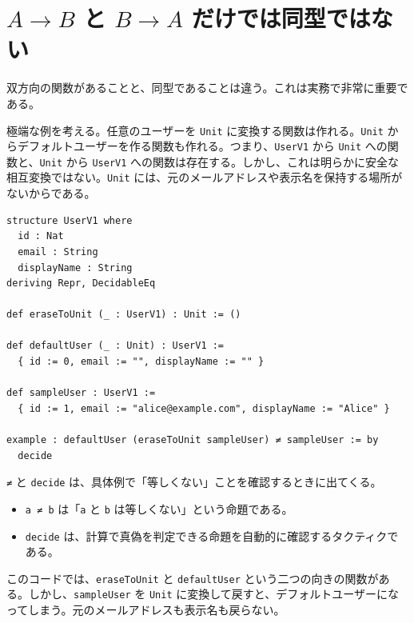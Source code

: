 \section{\texorpdfstring{$A \to B$ と $B \to A$}{A to B と B to A} だけでは同型ではない}
\label{sec:ch06-bidirectional-is-not-enough}

双方向の関数があることと、同型であることは違う。これは実務で非常に重要である。

極端な例を考える。任意のユーザーを \texttt{Unit} に変換する関数は作れる。\texttt{Unit} からデフォルトユーザーを作る関数も作れる。つまり、\texttt{UserV1} から \texttt{Unit} への関数と、\texttt{Unit} から \texttt{UserV1} への関数は存在する。しかし、これは明らかに安全な相互変換ではない。\texttt{Unit} には、元のメールアドレスや表示名を保持する場所がないからである。

\begin{listing}[htbp]
\begin{verbatim}
structure UserV1 where
  id : Nat
  email : String
  displayName : String
deriving Repr, DecidableEq

def eraseToUnit (_ : UserV1) : Unit := ()

def defaultUser (_ : Unit) : UserV1 :=
  { id := 0, email := "", displayName := "" }

def sampleUser : UserV1 :=
  { id := 1, email := "alice@example.com", displayName := "Alice" }

example : defaultUser (eraseToUnit sampleUser) ≠ sampleUser := by
  decide
\end{verbatim}
\caption{双方向の関数があっても同型とは限らない}
\label{lst:ch06_bidirectional_not_iso}
\end{listing}

\begin{syntaxbox}
\texttt{≠} と \texttt{decide} は、具体例で「等しくない」ことを確認するときに出てくる。
\begin{itemize}
\item \texttt{a ≠ b} は「\texttt{a} と \texttt{b} は等しくない」という命題である。
\item \texttt{decide} は、計算で真偽を判定できる命題を自動的に確認するタクティクである。
\end{itemize}
\end{syntaxbox}

このコードでは、\texttt{eraseToUnit} と \texttt{defaultUser} という二つの向きの関数がある。しかし、\texttt{sampleUser} を \texttt{Unit} に変換して戻すと、デフォルトユーザーになってしまう。元のメールアドレスも表示名も戻らない。

